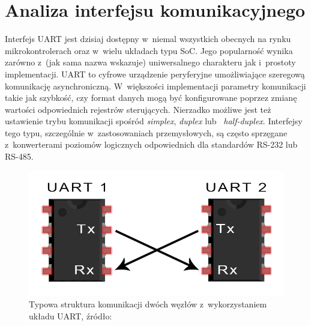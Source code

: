 
\section{Analiza interfejsu komunikacyjnego}

Interfejs UART jest dzisiaj dostępny w~niemal wszystkich obecnych na rynku mikrokontrolerach oraz w~wielu układach typu SoC. Jego popularność wynika zarówno z~(jak sama nazwa wskazuje) uniwersalnego charakteru jak i~prostoty implementacji. UART to cyfrowe urządzenie peryferyjne umożliwiające szeregową komunikację asynchroniczną. W~większości implementacji parametry komunikacji takie jak szybkość, czy format danych mogą być konfigurowane poprzez zmianę wartości odpowiednich rejestrów sterujących. Nierzadko możliwe jest też ustawienie trybu komunikacji spośród \textit{simplex}, \textit{duplex} lub ~\textit{half-duplex}. Interfejsy tego typu, szczególnie w~zastosowaniach przemysłowych, są często sprzęgane z~konwerterami poziomów logicznych odpowiednich dla standardów RS-232 lub RS-485.

\begin{figure}[ht]
    \centering
    \includegraphics[scale=0.5]{img/theoretical-analysis/uart.png}
    \captionsetup{format=plain,justification=centering}
    \caption{Typowa struktura komunikacji dwóch węzłów z~wykorzystaniem układu UART, źródło: \cite{uart}}
    \label{uart}
\end{figure}

